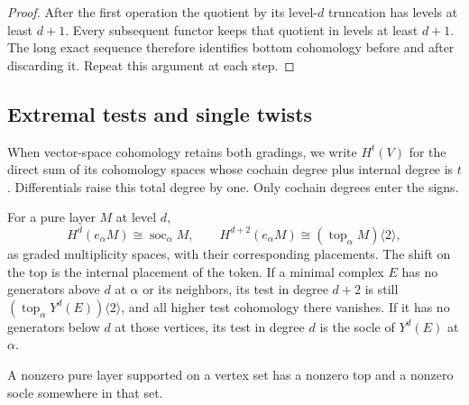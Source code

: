 \begin{proof}
After the first operation the quotient by its level-$d$ truncation
has levels at least $d+1$.  Every subsequent functor keeps that
quotient in levels at least $d+1$.  The long exact sequence therefore
identifies bottom cohomology before and after discarding it.
Repeat this argument at each step.
\end{proof}

\subsection{Extremal tests and single twists}

When vector-space cohomology retains both gradings, we write
$H^t(V)$ for the direct sum of its cohomology spaces whose cochain
degree plus internal degree is $t$.  Differentials raise this total
degree by one.  Only cochain degrees enter the signs.

\begin{lemma}
\label{lem:layers-extremal-tests}
For a pure layer $M$ at level $d$,
\begin{equation}
 H^d(e_\alpha M)\cong\operatorname{soc}_\alpha M,
 \qquad
 H^{d+2}(e_\alpha M)\cong
                  (\operatorname{top}_\alpha M)\langle2\rangle,
 \label{eq:layers-extremal-tests}
\end{equation}
as graded multiplicity spaces, with their corresponding placements.
The shift on the top is the internal placement of the token.
If a minimal complex $E$ has no generators above $d$ at $\alpha$
or its neighbors, its test in degree $d+2$ is still
$(\operatorname{top}_\alpha Y^d(E))\langle2\rangle$, and all
higher test cohomology there vanishes.
If it has no generators below $d$ at those vertices, its test in
degree $d$ is the socle of $Y^d(E)$ at $\alpha$.

A nonzero pure layer supported on a vertex set has a nonzero top
and a nonzero socle somewhere in that set.
\end{lemma}

